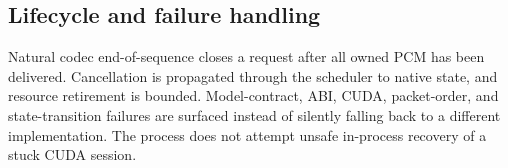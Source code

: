 \subsection{Lifecycle and failure handling}

Natural codec end-of-sequence closes a request after all owned PCM has been
delivered. Cancellation is propagated through the scheduler to native state,
and resource retirement is bounded. Model-contract, ABI, CUDA, packet-order,
and state-transition failures are surfaced instead of silently falling back to
a different implementation. The process does not attempt unsafe in-process
recovery of a stuck CUDA session.

